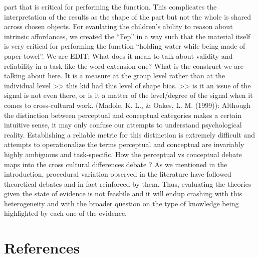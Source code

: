 \documentclass[10pt, letterpaper]{article}
\begin{document}
part that is critical for performing the function. This complicates the
interpretation of the results as the shape of the part but not the whole
is shared across chosen objects. For evaulating the children's ability
to reason about intrinsic affordances, we created the ``Fep'' in a way
such that the material itself is very critical for performing the
function ``holding water while being made of paper towel''. We are EDIT:
What does it mean to talk about validity and reliability in a task like
the word extension one? What is the construct we are talking about here.
It is a measure at the group level rather than at the individual level
\textgreater\textgreater{} this kid had this level of shape bias.
\textgreater\textgreater{} is it an issue of the signal is not even
there, or is it a matter of the level/degree of the signal when it comes
to cross-cultural work. (Madole, K. L., \& Oakes, L. M. (1999)):
Although the distinction between perceptual and conceptual categories
makes a certain intuitive sense, it may only confuse our attempts to
understand psychological reality. Establishing a reliable metric for
this distinction is extremely difficult and attempts to operationalize
the terms perceptual and conceptual are invariably highly ambiguous and
task-specific. How the perceptual vs conceptual debate maps into the
cross cultural differences debate ? As we mentioned in the introduction,
procedural variation observed in the literature have followed
theoretical debates and in fact reinforced by them. Thus, evaluating the
theories given the state of evidence is not feasbile and it will endup
crashing with this heterogeneity and with the broader question on the
type of knowledge being highlighted by each one of the evidence.

\hypertarget{references}{%
\section{References}\label{references}}

\setlength{\parindent}{-0.1in} 
\setlength{\leftskip}{0.125in}

\noindent
\end{document}
